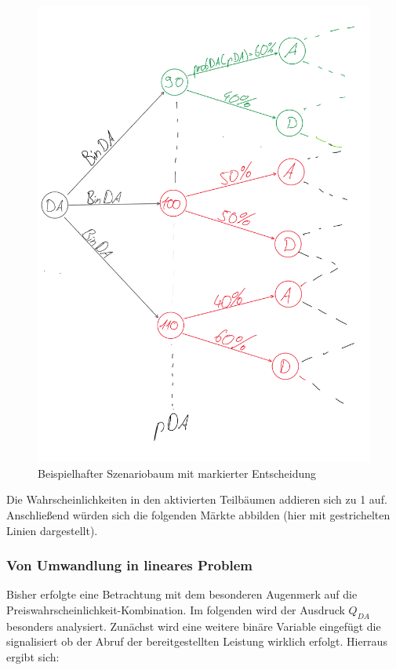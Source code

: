 \begin{figure}[H]

    \includegraphics[width=1\linewidth]{pictures/szBaumBeispiel_markiert.png}
    \caption{Beispielhafter Szenariobaum mit markierter Entscheidung}
    \label{fig:enter-label}
\end{figure}

Die Wahrscheinlichkeiten in den aktivierten Teilbäumen addieren sich zu 1 auf.
Anschließend würden sich die folgenden Märkte abbilden (hier mit gestrichelten Linien dargestellt).\\

\subsubsection{Von Umwandlung in lineares Problem}
Bisher erfolgte eine Betrachtung mit dem besonderen Augenmerk auf die Preiswahrscheinlichkeit-Kombination.
Im folgenden wird der Ausdruck $Q_{DA}$ besonders analysiert. Zunächst wird eine weitere binäre Variable eingefügt die signalisiert ob der Abruf der bereitgestellten Leistung wirklich erfolgt.
Hierraus ergibt sich:

